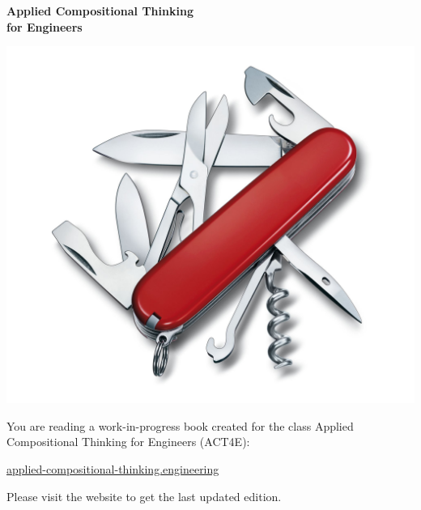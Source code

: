 
\begin{center}

\vspace{3cm}
{\Large\bfseries Applied Compositional Thinking \\ for Engineers}


\end{center}

\vspace{3cm}
\begin{center}
    \includegraphics[width=0.5\linewidth]{pics/knife.jpg}
\end{center}


\vfill

You are reading a work-in-progress book created for the
class Applied Compositional Thinking for Engineers (ACT4E):

\href{https://applied-compositional-thinking.engineering}{applied-compositional-thinking.engineering}

Please visit the website to get the last updated edition.
